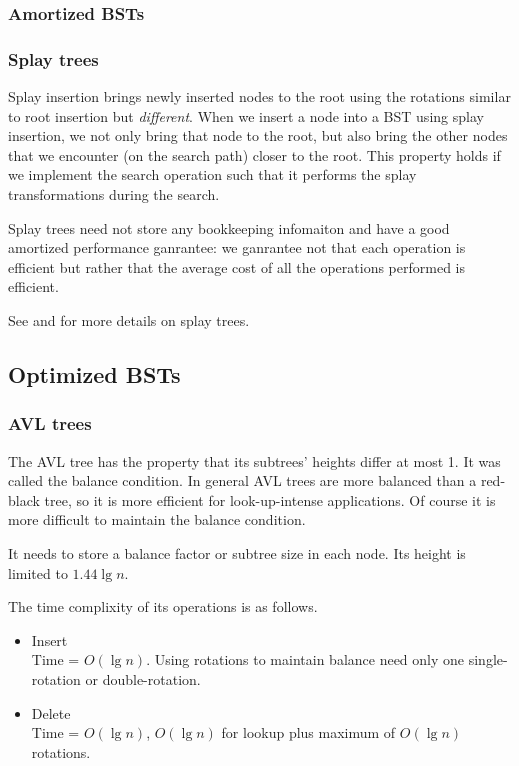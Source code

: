 \documentclass[12pt]{article}
\begin{document}
\subsubsection{Amortized BSTs}

\subsubsection{Splay trees}

Splay insertion brings newly inserted nodes to the root using the rotations
similar to root insertion but {\em different}.  When we insert a node into
a BST using splay insertion, we not only bring that node to the root, but
also bring the other nodes that we encounter (on the search path) closer to
the root.  This property holds if we implement the search operation such
that it performs the splay transformations during the search.

Splay trees need not store any bookkeeping infomaiton and have a good
amortized performance ganrantee: we ganrantee not that each operation is
efficient but rather that the average cost of all the operations performed
is efficient.

See \cite{Sedgewick98} and \cite{Sleator85} for more details on splay
trees.

\subsection{Optimized BSTs}

\subsubsection{AVL trees}

The AVL tree has the property that its subtrees' heights differ at most 1.
It was called the balance condition.  In general AVL trees are more
balanced than a red-black tree, so it is more efficient for look-up-intense
applications.  Of course it is more difficult to maintain the balance
condition.

It needs to store a balance factor or subtree size in each node.  Its
height is limited to $1.44\lg n$.

The time complixity of its operations is as follows.
    \begin{itemize}
        \item Insert \\
            Time = $O(\lg n)$.  Using rotations to maintain
            balance need only one single-rotation or double-rotation.
        \item Delete \\
            Time = $O(\lg n)$, $O(\lg n)$ for lookup plus maximum
            of $O(\lg n)$ rotations.
    \end{itemize}
\end{document}
